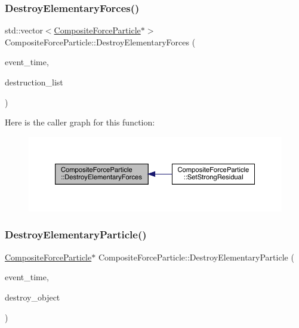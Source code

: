 \subsubsection{\texorpdfstring{Destroy\+Elementary\+Forces()}{DestroyElementaryForces()}}
{\footnotesize\ttfamily std\+::vector$<$\hyperlink{class_composite_force_particle}{Composite\+Force\+Particle}$\ast$$>$ Composite\+Force\+Particle\+::\+Destroy\+Elementary\+Forces (\begin{DoxyParamCaption}\item[{std\+::chrono\+::time\+\_\+point$<$ \hyperlink{universe_8h_a0ef8d951d1ca5ab3cfaf7ab4c7a6fd80}{Clock} $>$}]{event\+\_\+time,  }\item[{std\+::vector$<$ \hyperlink{class_composite_force_particle}{Composite\+Force\+Particle} $\ast$$>$}]{destruction\+\_\+list }\end{DoxyParamCaption})}

Here is the caller graph for this function\+:\nopagebreak
\begin{figure}[H]
\begin{center}
\leavevmode
\includegraphics[width=350pt]{class_composite_force_particle_af07d8607737f7881aac6314313d800e3_icgraph}
\end{center}
\end{figure}
\mbox{\label{class_composite_force_particle_ac176d2e41d75e308d4b510f3338d8b9e}} 
\subsubsection{\texorpdfstring{Destroy\+Elementary\+Particle()}{DestroyElementaryParticle()}}
{\footnotesize\ttfamily \hyperlink{class_composite_force_particle}{Composite\+Force\+Particle}$\ast$ Composite\+Force\+Particle\+::\+Destroy\+Elementary\+Particle (\begin{DoxyParamCaption}\item[{std\+::chrono\+::time\+\_\+point$<$ \hyperlink{universe_8h_a0ef8d951d1ca5ab3cfaf7ab4c7a6fd80}{Clock} $>$}]{event\+\_\+time,  }\item[{\hyperlink{class_composite_force_particle}{Composite\+Force\+Particle} $\ast$}]{destroy\+\_\+object }\end{DoxyParamCaption})}

